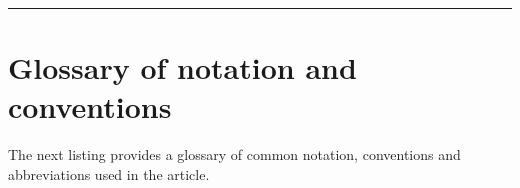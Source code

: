 \documentclass[11pt,reqno,a4letter]{article}
\numberwithin{equation}{section}
\numberwithin{figure}{section}
\numberwithin{table}{section}
\theoremstyle{plain}
\numberwithin{theorem}{section}
\theoremstyle{definition}
\begin{document}
\bigskip\hrule\smallskip 

\appendix
{}
\setcounter{section}{0} 
\renewcommand{\thesection}{\Alph{section}} 

\section{Glossary of notation and conventions}
\label{Section_NotationAndConventions}

The next listing provides a 
glossary of common notation, conventions and 
abbreviations used in the article. 

\renewcommand*{\glsclearpage}{}
\renewcommand{\glossarysection}[2][]{}
\printglossary[type={symbols},
               style={glossstyleSymbol},
               nogroupskip=true]
\end{document}
